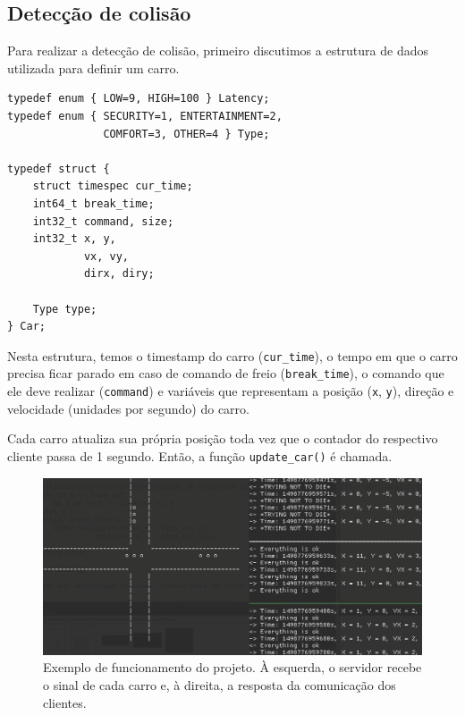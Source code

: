 \documentclass[10pt,twocolumn,letterpaper]{article}
\begin{document}
\subsection{Detecção de colisão}
    Para realizar a detecção de colisão, primeiro discutimos a estrutura de dados utilizada para definir um carro.

\begin{lstlisting}[caption={Estrutura utilizada para a descrição de um carro}, label=Algorithm]
typedef enum { LOW=9, HIGH=100 } Latency;
typedef enum { SECURITY=1, ENTERTAINMENT=2, 
               COMFORT=3, OTHER=4 } Type;

typedef struct {
    struct timespec cur_time;
    int64_t break_time;
    int32_t command, size; 
    int32_t x, y, 
            vx, vy, 
            dirx, diry;

    Type type;
} Car;
\end{lstlisting}

    Nesta estrutura, temos o timestamp do carro (\texttt{cur\_time}), o tempo em que o carro precisa ficar parado em caso de comando de freio (\texttt{break\_time}), o comando que ele deve realizar (\texttt{command}) e variáveis que representam a posição (\texttt{x}, \texttt{y}), direção e velocidade (unidades por segundo) do carro.

    Cada carro atualiza sua própria posição toda vez que o contador do respectivo cliente passa de 1 segundo. Então, a função \texttt{update\_car()} é chamada.


\begin{figure}
\begin{center}
    \includegraphics[width=1\textwidth]{img/server-demo}
    \caption{Exemplo de funcionamento do projeto. À esquerda, o servidor recebe o sinal de cada carro e, à direita, a resposta da comunicação dos clientes.}   
\end{center} 
\end{figure}
\end{document}
